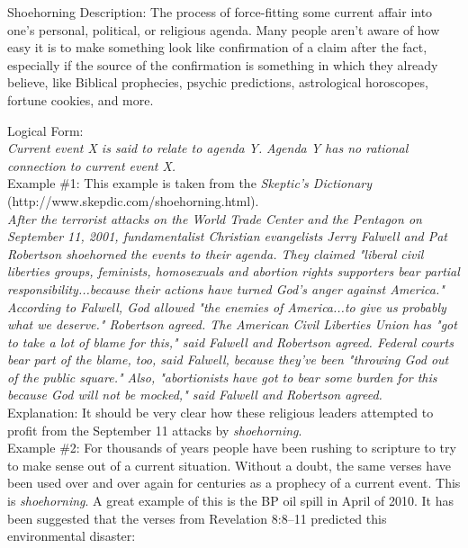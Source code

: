 \documentclass[a4paper,12pt,single,pdftex]{scrartcl}
\begin{document}
Shoehorning
    Description: The process of force-fitting some current affair into one's personal, political, or religious agenda.  Many people aren't aware of how easy it is to make something look like confirmation of a claim after the fact, especially if the source of the confirmation is something in which they already believe, like Biblical prophecies, psychic predictions, astrological horoscopes, fortune cookies, and more.

    
      Logical Form:
    \\

    
      {\em Current event X is said to relate to agenda Y.} \newline
{\em Agenda Y has no rational connection to current event X.}
    \\

    
      Example \#1: This example is taken from the {\it Skeptic’s Dictionary} (http://www.skepdic.com/shoehorning.html). 
    \\

    
      {\em After the terrorist attacks on the World Trade Center and the Pentagon on September 11, 2001, fundamentalist Christian evangelists Jerry Falwell and Pat Robertson shoehorned the events to their agenda. They claimed "liberal civil liberties groups, feminists, homosexuals and abortion rights supporters bear partial responsibility...because their actions have turned God's anger against America." According to Falwell, God allowed "the enemies of America...to give us probably what we deserve." Robertson agreed. The American Civil Liberties Union has "got to take a lot of blame for this," said Falwell and Robertson agreed. Federal courts bear part of the blame, too, said Falwell, because they've been "throwing God out of the public square." Also, "abortionists have got to bear some burden for this because God will not be mocked," said Falwell and Robertson agreed.}
    \\

    
      Explanation: It should be very clear how these religious leaders attempted to profit from the September 11 attacks by {\it shoehorning}.
    \\

    
      Example \#2: For thousands of years people have been rushing to scripture to try to make sense out of a current situation.  Without a doubt, the same verses have been used over and over again for centuries as a prophecy of a current event.  This is {\it shoehorning}.  A great example of this is the BP oil spill in April of 2010.  It has been suggested that the verses from Revelation 8:8–11 predicted this environmental disaster:
    \\
\end{document}

